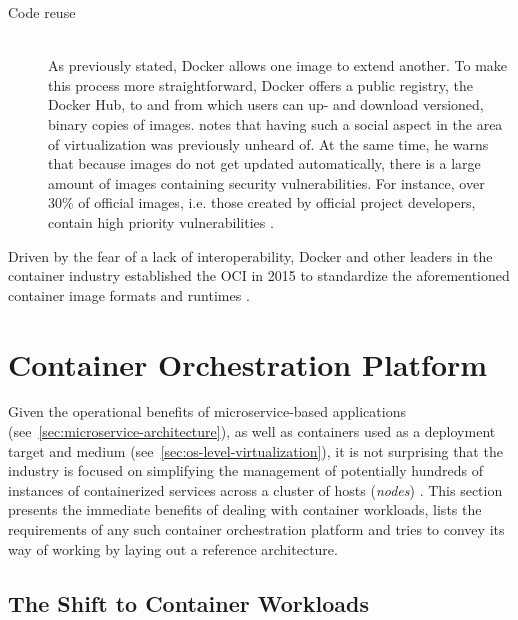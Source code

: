 \begin{description}
  \item[Code reuse]
  \hfill \\
  As previously stated, Docker allows one image to extend another. To make this process more straightforward, Docker offers a public registry, the Docker Hub, to and from which users can up- and download versioned, binary copies of images. \citeauthor{eder2016hypervisor} notes that having such a social aspect in the area of virtualization was previously unheard of. At the same time, he warns that because images do not get updated automatically, there is a large amount of images containing security vulnerabilities. For instance, over 30\% of official images, i.e. those created by official project developers, contain high priority vulnerabilities \cite[pp.~6--7]{eder2016hypervisor}.
\end{description}

Driven by the fear of a lack of interoperability, Docker and other leaders in the container industry established the \ac{OCI} in 2015 to standardize the aforementioned container image formats and runtimes \cite[p.~23]{da2018containers}.


\section{Container Orchestration Platform}
\label{sec:container-orchestration-platform}

Given the operational benefits of microservice-based applications (see~\autoref{sec:microservice-architecture}), as well as containers used as a deployment target and medium (see~\autoref{sec:os-level-virtualization}), it is not surprising that the industry is focused on simplifying the management of potentially hundreds of instances of containerized services across a cluster of hosts (\textit{nodes}) \cite[p.~44]{khan2017key} \cite[p.~1]{pahl2017cloud}. This section presents the immediate benefits of dealing with container workloads, lists the requirements of any such container orchestration platform and tries to convey its way of working by laying out a reference architecture.


\subsection{The Shift to Container Workloads}
\label{sec:shift-to-container-workloads}

